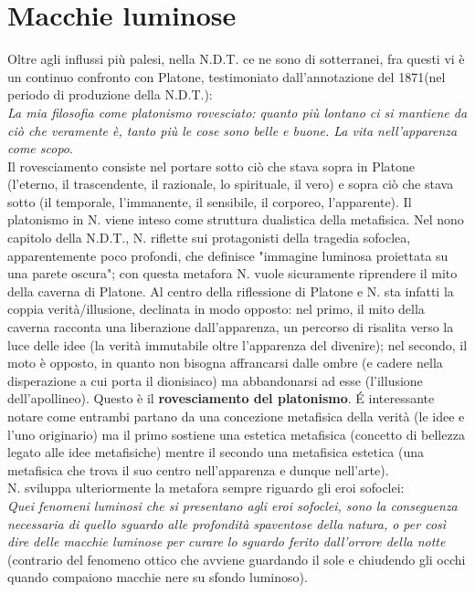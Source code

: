 \documentclass[10pt,a4paper]{article}
\begin{document}
\section{Macchie luminose}
Oltre agli influssi più palesi, nella N.D.T. ce ne sono di sotterranei, fra questi vi è un continuo confronto con Platone, testimoniato dall'annotazione del 1871(nel periodo di produzione della N.D.T.):\\
\textit{La mia filosofia come platonismo rovesciato: quanto più lontano ci si mantiene da ciò che veramente è, tanto più le cose sono belle e buone. La vita nell'apparenza come scopo}.\\
Il rovesciamento consiste nel portare sotto ciò che stava sopra in Platone (l'eterno, il trascendente, il razionale, lo spirituale, il vero) e sopra ciò che stava sotto (il temporale, l'immanente, il sensibile, il corporeo, l'apparente). Il platonismo in N. viene inteso come struttura dualistica della metafisica. Nel nono capitolo della N.D.T., N. riflette sui protagonisti della tragedia sofoclea, apparentemente poco profondi, che definisce "immagine luminosa proiettata su una parete oscura"; con questa metafora N. vuole sicuramente riprendere il mito della caverna di Platone. Al centro della riflessione di Platone e N. sta infatti la coppia verità/illusione, declinata in modo opposto: nel primo, il mito della caverna racconta una liberazione dall'apparenza, un percorso di risalita verso la luce delle idee (la verità immutabile oltre l'apparenza del divenire); nel secondo, il moto è opposto, in quanto non bisogna affrancarsi dalle ombre (e cadere nella disperazione a cui porta il dionisiaco) ma abbandonarsi ad esse (l'illusione dell'apollineo). Questo è il \textbf{rovesciamento del platonismo}. \'E interessante notare come entrambi partano da una concezione metafisica della verità (le idee e l'uno originario) ma il primo sostiene una estetica metafisica (concetto di bellezza legato alle idee metafisiche) mentre il secondo una metafisica estetica (una metafisica che trova il suo centro nell'apparenza e dunque nell'arte).\\
N. sviluppa ulteriormente la metafora sempre riguardo gli eroi sofoclei:\\
\textit{Quei fenomeni luminosi che si presentano agli eroi sofoclei, sono la conseguenza necessaria di quello sguardo alle profondità spaventose della natura, o per così dire delle macchie luminose per curare lo sguardo ferito dall'orrore della notte} (contrario del fenomeno ottico che avviene guardando il sole e chiudendo gli occhi quando compaiono macchie nere su sfondo luminoso).\\
\end{document}
